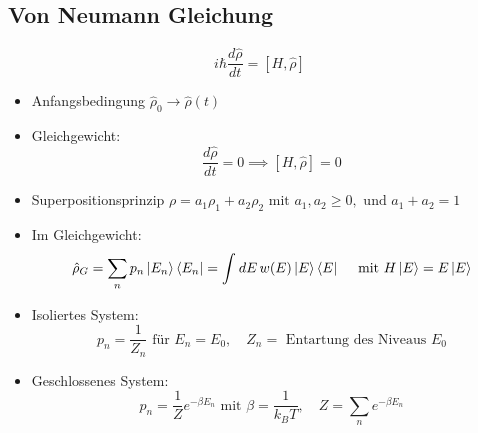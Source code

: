 \subsection*{Von Neumann Gleichung}
\[ i \hbar \frac{d\hat{\rho}}{dt} = \left[ H, \hat{\rho} \right] \] 
\begin{itemize}
  \item Anfangsbedingung $\hat{\rho}_0 \to  \hat{\rho}(t)$
  \item Gleichgewicht: \[ \frac{d \hat{\rho}}{dt}=0 \implies  \left[ H, \hat{\rho} \right]=0  \] 
  \item Superpositionsprinzip $\rho= a_1 \rho_1 + a_2 \rho_2 \text{ mit }
    a_1, a_2 \ge 0, \text{ und } a_1+a_2 =1 $
  \item Im Gleichgewicht: \[ \hat{\rho}_G = \sum_{n}^{} p_n \Ket{E_n}\Bra{E_n}
    = \int_{}^{} dE\, w(E)\Ket{E}\Bra{E} \quad \text{ mit }
    H \Ket{E}= E \Ket{E}\] 
  \item Isoliertes System: \[ p_n = \frac{1}{Z_n} \text{ f\"ur } E_n = E_0,
    \quad Z_n= \text{ Entartung des Niveaus } E_0 \] 
  \item Geschlossenes System: \[ p_n = \frac{1}{Z} e^{-\beta E_n} \text{ mit } 
    \beta= \frac{1}{k_B T}, \quad Z=\sum_{n}^{} e^{-\beta E_n} \] 
\end{itemize}

